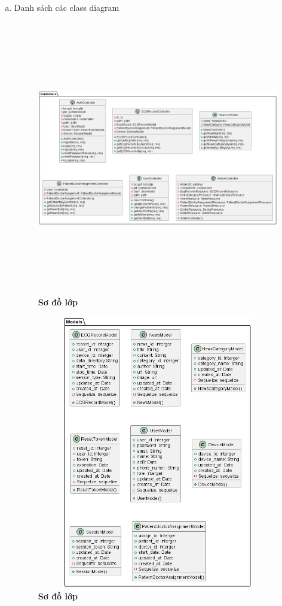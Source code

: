 \documentclass{article}%
\begin{document}
\begin{enumerate}[a)]
\item Danh sách các class diagram

\begin{figure}[H]
  \centering
  \includegraphics[width=15cm,height=12cm]{Images/server/class/class_controller.png}
  \caption[Sơ đồ lớp]{\bfseries \fontsize{12pt}{0pt}\selectfont Sơ đồ lớp}
  \label{hinh2} %
\end{figure}



\begin{figure}[H]
  \centering
  \includegraphics[width=15cm,height=12cm]{Images/server/class/class_model.png}
  \caption[Sơ đồ lớp]{\bfseries \fontsize{12pt}{0pt}\selectfont Sơ đồ lớp}
  \label{hinh2} %
\end{figure}



\end{enumerate}
\end{document}
